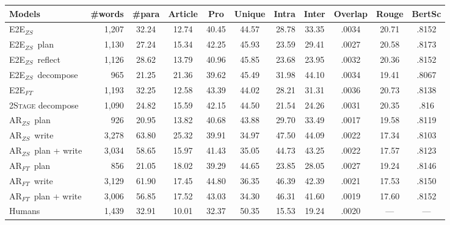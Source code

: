 \documentclass{article}
\newcommand{\agentsroomzs}{{\sc AR$_{ZS}$}}
\newcommand{\agentsroomft}{{\sc AR$_{FT}$}}
\newcommand{\baselinezs}{{\sc E2E$_{ZS}$}}
\newcommand{\baselineft}{{\sc E2E$_{FT}$}}
\begin{document}
\begin{table}[t]
\begin{center}
\begin{tabular}{@{}l@{~~}r@{~~}c@{~}c@{~}c@{~}c@{~}r@{~~}c@{~}c@{~}c@{~}c@{}}
\\
\toprule
Models   & \#words & \#para & Article & Pro &  Unique & Intra & Inter & Overlap &
Rouge & BertSc \\ \midrule
  \baselinezs & 1,207 & 32.24 & 12.74 & 40.45 &  44.57 & 28.78 & 33.35
  & .0034 & 20.71 & .8152 \\
  \baselinezs~plan&  1,130 &27.24 &15.34 & 42.25 &45.93 &	23.59
  &	29.41& 	.0027 &	20.58& 	.8173\\
  \baselinezs~reflect& 1,126 &	28.62 &	13.79 &	40.96& 	45.85& 	23.68
  &	23.95& 	.0032 &	20.36 & 	.8152\\
  \baselinezs~decompose & 965 &21.25&21.36& 39.62 &	45.49 &	31.98
  &44.10& 	.0034 & 	19.41 &	.8067\\
  \baselineft & 1,193 & 32.25 & 12.58 &   43.39 & 44.02 &28.21 & 31.31
  & .0036 & 20.73 & .8138 \\ 
\textsc{2Stage} decompose &  	1,090 &	24.82 &	15.59 &	42.15& 	44.50&
21.54 &	24.26 &	.0031 	&20.35 &	.816 \\\hline
  \agentsroomzs~plan & 926 & 20.95 & 13.82 & 40.68 & 43.88 & 29.70 & 33.49 & .0017 & 19.58 & .8119 \\
  \agentsroomzs~write & 3,278 & 63.80 & 25.32 & 39.91 &34.97 & 47.50 & 44.09 & .0022 & 17.34 & .8103 \\
  \agentsroomzs~plan + write  &  3,034& 58.65 & 15.97 & 41.43 &  35.05 & 44.73 &
  43.25 & .0022 & 17.57 & .8123 \\
  \agentsroomft~plan & 856 & 21.05 & 18.02 & 39.29  & 44.65 & 23.85 & 28.05 & .0027 & 19.24 & .8146 \\
  \agentsroomft~write & 3,129 & 61.90 & 17.45 & 44.80 & 36.35 & 46.39 & 42.39 & .0021 & 17.53 & .8150 \\
   \agentsroomft~plan + write & 3,006 & 56.85 & 17.52 & 43.03 & 34.30 & 46.31 &
   41.60 & .0019 & 17.60 & .8152 \\ \hline
     Humans & 1,439 & 32.91 & 10.01 & 32.37 & 50.35 & 15.53 & 19.24 &
  .0020 & --- & --- \\\bottomrule
\end{tabular}
\end{center}
\end{table}
\end{document}
